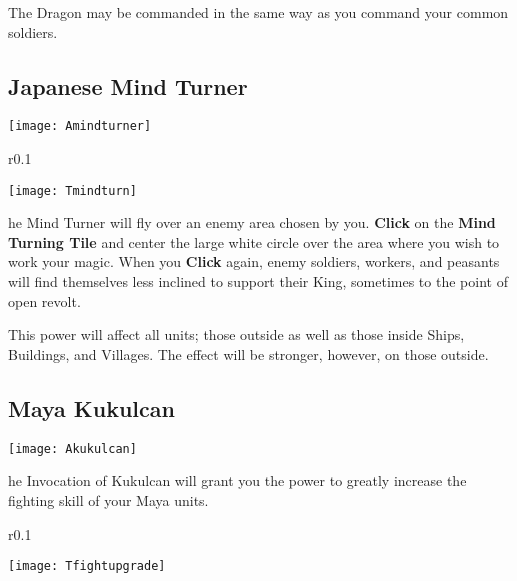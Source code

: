 The Dragon may be commanded in the same way as you command your common soldiers.

\subsection{Japanese Mind Turner}


\begin{center}
    \texttt{[image: Amindturner]}
\end{center}

\begin{wrapfigure}{r}{0.1\textwidth}
    \vspace{-20pt}
    \begin{center}
        \texttt{[image: Tmindturn]}
    \end{center}
    \vspace{-20pt}
\end{wrapfigure}

he Mind Turner will fly over an enemy area chosen by you. \textbf{Click} on the \textbf{Mind Turning Tile} and center the large white circle over the area where you wish to work your magic. When you \textbf{Click} again, enemy soldiers, workers, and peasants will find themselves less inclined to support their King, sometimes to the point of open revolt.

This power will affect all units; those outside as well as those inside Ships, Buildings, and Villages. The effect will be stronger, however, on those outside.

\subsection{Maya Kukulcan}


\begin{center}
    \texttt{[image: Akukulcan]}
\end{center}

he Invocation of Kukulcan will grant you the power to greatly increase the fighting skill of your Maya units.

\begin{wrapfigure}{r}{0.1\textwidth}
    \vspace{-20pt}
    \begin{center}
        \texttt{[image: Tfightupgrade]}
    \end{center}
    \vspace{-20pt}
\end{wrapfigure}

